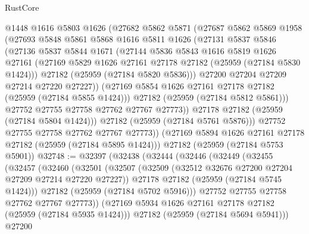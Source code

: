 \begin{lexlean}{RustCore}
\begin{coremodule}
            @1448
            @1616
            @5803
            @1626
            (@27682
              @5862
              @5871
              (@27687
                @5862
                @5869
                @1958
                (@27693
                  @5848
                  @5861
                  @5868
                  @1616
                  @5811
                  @1626
                  (@27131
                    @5837
                    @5846
                    (@27136
                      @5837
                      @5844
                      @1671
                      (@27144
                        @5836
                        @5843
                        @1616
                        @5819
                        @1626
                        @27161
                        (@27169 @5829 @1626 @27161 @27178 @27182 (@25959 (@27184 @5830 @1424)))
                        @27182
                        (@25959 (@27184 @5820 @5836)))
                      @27200
                      @27204
                      @27209
                      @27214
                      @27220
                      @27227))
                  (@27169 @5854 @1626 @27161 @27178 @27182 (@25959 (@27184 @5855 @1424)))
                  @27182
                  (@25959 (@27184 @5812 @5861)))
                @27752
                @27755
                @27758
                @27762
                @27767
                @27773))
            @27178
            @27182
            (@25959 (@27184 @5804 @1424)))
          @27182
          (@25959 (@27184 @5761 @5876)))
        @27752
        @27755
        @27758
        @27762
        @27767
        @27773))
    (@27169 @5894 @1626 @27161 @27178 @27182 (@25959 (@27184 @5895 @1424)))
    @27182
    (@25959 (@27184 @5753 @5901))
@32748 := @32397
    (@32438
      (@32444
        (@32446
          (@32449
            (@32455
              (@32457
                (@32460
                  (@32501
                    (@32507
                      (@32509 (@32512 @32676 @27200 @27204 @27209 @27214 @27220 @27227))
                      @27178
                      @27182
                      (@25959 (@27184 @5745 @1424)))
                    @27182
                    (@25959 (@27184 @5702 @5916)))
                  @27752
                  @27755
                  @27758
                  @27762
                  @27767
                  @27773))
              (@27169 @5934 @1626 @27161 @27178 @27182 (@25959 (@27184 @5935 @1424)))
              @27182
              (@25959 (@27184 @5694 @5941)))
            @27200

\end{coremodule}
\end{lexlean}
